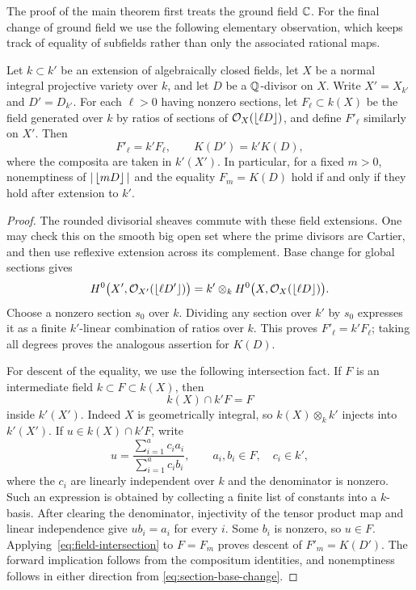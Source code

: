 The proof of the main theorem first treats the ground field $\mathbb C$.
For the final change of ground field we use the following elementary
observation, which keeps track of equality of subfields rather than only
the associated rational maps.

\begin{lemma}\label{lem:field-descent}
Let $k\subset k'$ be an extension of algebraically closed fields, let
$X$ be a normal integral projective variety over $k$, and let $D$ be a
$\mathbb Q$-divisor on $X$.  Write $X'=X_{k'}$ and $D'=D_{k'}$.
For each $\ell>0$ having nonzero sections, let $F_\ell\subset k(X)$
be the field generated over $k$ by ratios of sections of
$\mathcal O_X(\left\lfloor \ell D\right\rfloor)$, and define $F'_\ell$ similarly on $X'$.
Then
\[
 F'_\ell=k'F_\ell,\qquad K(D')=k'K(D),
\]
where the composita are taken in $k'(X')$.  In particular, for a fixed
$m>0$, nonemptiness of $|\left\lfloor mD\right\rfloor|$ and the equality
$F_m=K(D)$ hold if and only if they hold after extension to $k'$.
\end{lemma}

\begin{proof}
The rounded divisorial sheaves commute with these field extensions.
One may check this on the smooth big open set where the prime divisors
are Cartier, and then use reflexive extension across its complement.
Base change for global sections gives
\begin{equation}\label{eq:section-base-change}
 H^0\bigl(X',\mathcal O_{X'}(\left\lfloor \ell D'\right\rfloor)\bigr)
 =k'\otimes_k H^0\bigl(X,\mathcal O_X(\left\lfloor \ell D\right\rfloor)\bigr).
\end{equation}
Choose a nonzero section $s_0$ over $k$.  Dividing any section over
$k'$ by $s_0$ expresses it as a finite $k'$-linear combination of
ratios over $k$.  This proves $F'_\ell=k'F_\ell$; taking all degrees
proves the analogous assertion for $K(D)$.

For descent of the equality, we use the following intersection fact.
If $F$ is an intermediate field $k\subset F\subset k(X)$, then
\begin{equation}\label{eq:field-intersection}
 k(X)\cap k'F=F
\end{equation}
inside $k'(X')$.  Indeed $X$ is geometrically integral, so
$k(X)\otimes_k k'$ injects into $k'(X')$.  If $u\in k(X)\cap k'F$,
write
\[
 u=\frac{\sum_{i=1}^a c_i a_i}{\sum_{i=1}^a c_i b_i},
 \qquad a_i,b_i\in F,\quad c_i\in k',
\]
where the $c_i$ are linearly independent over $k$ and the denominator
is nonzero.  Such an expression is obtained by collecting a finite
list of constants into a $k$-basis.  After clearing the denominator,
injectivity of the tensor product map and linear independence give
$ub_i=a_i$ for every $i$.  Some $b_i$ is nonzero, so $u\in F$.
Applying~\eqref{eq:field-intersection} to $F=F_m$ proves descent of
$F'_m=K(D')$.  The forward implication follows from the compositum
identities, and nonemptiness follows in either direction from
\eqref{eq:section-base-change}.
\end{proof}

